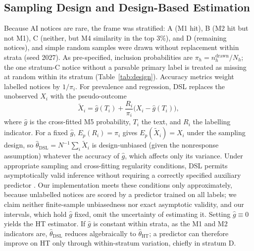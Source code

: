 \documentclass[runningheads]{llncs}
\begin{document}
\subsection{Sampling Design and Design-Based Estimation}
Because AI notices are rare, the frame was stratified: A (M1 hit), B (M2 hit but not M1), C (neither, but M4 similarity in the top 3\%), and D (remaining notices), and simple random samples were drawn without replacement within strata (seed 2027). As pre-specified, inclusion probabilities are $\pi_h=n^{\mathrm{drawn}}_h/N_h$; the one stratum-C notice without a parsable primary label is treated as missing at random within its stratum (Table~\ref{tab:design}). Accuracy metrics weight labelled notices by $1/\pi_i$. For prevalence and regression, DSL replaces the unobserved $X_i$ with the pseudo-outcome
\begin{equation}
\tilde{X}_i=\hat{g}(T_i)+\frac{R_i}{\pi_i}\bigl(X_i-\hat{g}(T_i)\bigr),
\label{eq:pseudo}
\end{equation}
where $\hat{g}$ is the cross-fitted M5 probability, $T_i$ the text, and $R_i$ the labelling indicator. For a fixed $\hat{g}$, $E_p(R_i)=\pi_i$ gives $E_p(\tilde{X}_i)=X_i$ under the sampling design, so $\hat\theta_{\mathrm{DSL}}=N^{-1}\sum_i\tilde{X}_i$ is design-unbiased (given the nonresponse assumption) whatever the accuracy of $\hat{g}$, which affects only its variance. Under appropriate sampling and cross-fitting regularity conditions, DSL permits asymptotically valid inference without requiring a correctly specified auxiliary predictor \cite{egami2023}. Our implementation meets these conditions only approximately, because unlabelled notices are scored by a predictor trained on all labels; we claim neither finite-sample unbiasedness nor exact asymptotic validity, and our intervals, which hold $\hat{g}$ fixed, omit the uncertainty of estimating it. Setting $\hat{g}\equiv0$ yields the HT estimator. If $\hat{g}$ is constant within strata, as the M1 and M2 indicators are, $\hat\theta_{\mathrm{DSL}}$ reduces algebraically to $\hat\theta_{\mathrm{HT}}$; a predictor can therefore improve on HT only through within-stratum variation, chiefly in stratum D.
\end{document}
